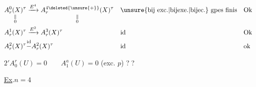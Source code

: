 \[
\begin{aligned}
 \underset{\substack{\Vert\\0}}{A_r^0(X)^\tau}&\xrightarrow{E^4}
 \underset{\substack{\Vert\\0}}{A_r^{4\deleted{\unsure{+}}}(X)^\tau}
 &&\text{\unsure{bij exc.|bijexe.|bijec.} gpes finis}&&\text{Ok}\\
 A_r^1(X)^\tau&\xrightarrow{E^2}A_r^3(X)^\tau&&\text{id}&&\text{Ok}\\
 A_r^2(X)^\tau&\overset{\mathrm{id}}{\mathord{-}}A_r^2(X)^\tau&&\text{id}&&\text{ok}
\end{aligned}
\]

\textcircled{$2'$}\qquad $A_0^r(U)=0\qquad A_1^a(U)=0$ \qquad (exc. $p$) \quad \textcircled{??}

\uline{Ex}.\quad $n=4$


